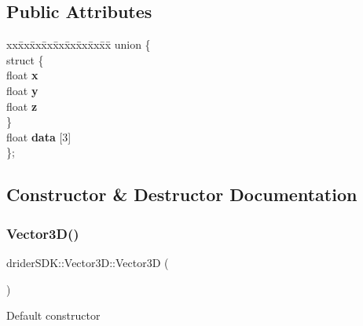 \subsection*{Public Attributes}
\begin{DoxyCompactItemize}
\item 
\mbox{\label{classdrider_s_d_k_1_1_vector3_d_a065a234f94a65617b2a62943f1b7ca1d}} 
\begin{tabbing}
xx\=xx\=xx\=xx\=xx\=xx\=xx\=xx\=xx\=\kill
union \{\\
\mbox{\label{uniondrider_s_d_k_1_1_vector3_d_1_1_0D20_ac6552a061d1b9b976df18a94973c54b1}} 
\>struct \{\\
\>\>float {\bfseries x}\\
\>\>float {\bfseries y}\\
\>\>float {\bfseries z}\\
\>\} \\
\>float {\bfseries data} \mbox{[}3\mbox{]}\\
\}; \\

\end{tabbing}\end{DoxyCompactItemize}


\subsection{Constructor \& Destructor Documentation}
\mbox{\label{classdrider_s_d_k_1_1_vector3_d_a13d08e7ca2aea2687fc886140fd3e7cb}} 
\subsubsection{\texorpdfstring{Vector3\+D()}{Vector3D()}\hspace{0.1cm}{\footnotesize\ttfamily [1/5]}}
{\footnotesize\ttfamily drider\+S\+D\+K\+::\+Vector3\+D\+::\+Vector3D (\begin{DoxyParamCaption}{ }\end{DoxyParamCaption})}

Default constructor \mbox{\label{classdrider_s_d_k_1_1_vector3_d_a69599690e85407589a6ac4f6dbe7454e}} 
